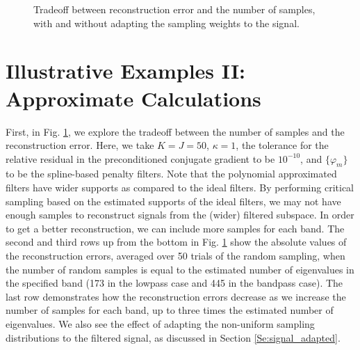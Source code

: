\documentclass[journal, 10pt]{IEEEtran}
\begin{document}
\begin{figure}[H]
\begin{minipage}[m]{0.4\linewidth}
\end{minipage}
\caption{Tradeoff between reconstruction error and the number of samples, with and without adapting the sampling weights to the signal.}\label{Fig:samp_tradeoff}
\end{figure}



\section{Illustrative Examples II: Approximate Calculations} \label{Se:ill2}

First, in Fig. \ref{Fig:samp_tradeoff}, we explore the tradeoff between the number of samples and the reconstruction error.  Here, we take $K=J=50$, $\kappa=1$, the tolerance for the relative residual in the preconditioned conjugate gradient to be $10^{-10}$, and $\{\varphi_m\}$ to be the spline-based penalty filters.  Note that the polynomial approximated filters have wider supports as compared to the ideal filters. By performing critical sampling based on the estimated supports of the ideal filters, we may not have enough samples to reconstruct signals from the (wider) filtered subspace. %
In order to get a better reconstruction, we can include more samples for each band. The second and third rows up from the bottom in Fig. \ref{Fig:samp_tradeoff} show the absolute values of the reconstruction errors, averaged over 50 trials of the random sampling, when the number of random samples is equal to the estimated number of eigenvalues in the specified band (173 in the lowpass case and 445 in the bandpass case). The last row demonstrates how the 
reconstruction errors %
decrease as we increase the number of samples for each band, up to three times the estimated number of eigenvalues. We also see the effect of adapting the non-uniform sampling distributions to the filtered signal, as discussed in Section \ref{Se:signal_adapted}. %
\end{document}
